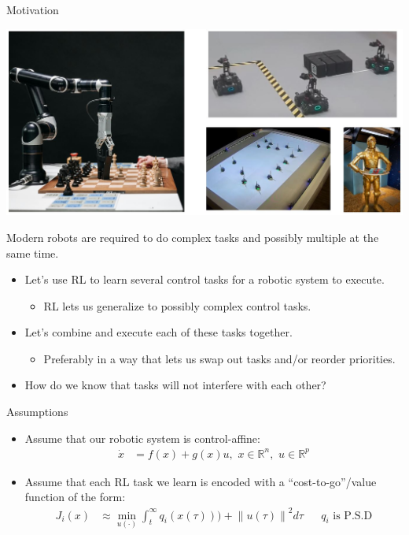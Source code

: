 \begin{frame}{Motivation}
	\begin{minipage}{\textwidth}
		\centering		
		\includegraphics[width=0.85\linewidth]{motivationsCombined}
	\end{minipage}%
	\seprule
	Modern robots are required to do complex tasks and possibly multiple at the same time.
\end{frame}

\begin{frame}
	\begin{itemize}
		\item{Let's use RL to learn several control tasks for a robotic system to execute.}
			\begin{itemize}
				\item{ RL lets us generalize to possibly complex control tasks.}
			\end{itemize}
		\item{Let's combine and execute each of these tasks together.}
			\begin{itemize}
				\item{Preferably in a way that lets us swap out tasks and/or reorder priorities.}
			\end{itemize}
		\item{ { \color{red} How do we know that tasks will not interfere with each other? } }
	\end{itemize}
\end{frame}

\begin{frame}{Assumptions}
	\begin{itemize}
		\item{Assume that our robotic system is control-affine:
	\begin{align*}
		\dot{x} &= f(x) + g(x)u, \,\, x \in \mathbb{R}^n, \,\, u \in \mathbb{R}^p
	\end{align*}}
		\item{Assume that each RL task we learn is encoded with a ``cost-to-go''/value function of the form:
	\begin{align*}
		J_i (x) &\approx \min_{u(\cdot)} \int_t^{\infty} q_i(x(\tau))) + {\lVert u(\tau) \rVert}^2 d \tau && \text{$q_i$ is P.S.D}
	\end{align*}}
	\end{itemize}
\end{frame}

